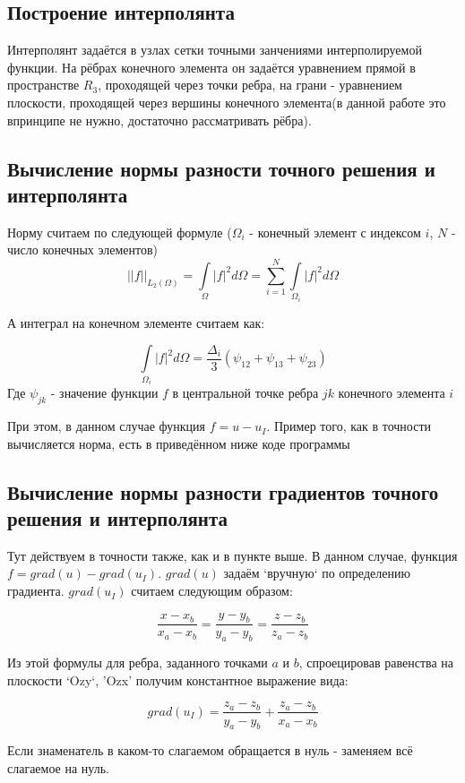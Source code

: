 \documentclass[12pt]{article}
\begin{document}
\subsection{Построение интерполянта}
Интерполянт задаётся в узлах сетки точными занчениями интерполируемой функции. На рёбрах конечного элемента он задаётся уравнением прямой в пространстве $R_3$, проходящей через точки ребра, на грани - уравнением плоскости, проходящей через вершины конечного элемента(в данной работе это впринципе не нужно, достаточно рассматривать рёбра).

\subsection{Вычисление нормы разности точного решения и интерполянта}

Норму считаем по следующей формуле
($\Omega_i$ - конечный элемент с индексом $i$, $N$ - число конечных элементов)
$$
||f||_{L_2(\Omega)} = \int\limits_{\Omega}|f|^2d\Omega = \sum_{i=1}^{N}\int\limits_{\Omega_i}|f|^2d\Omega
$$

А интеграл на конечном элементе считаем как:

$$
\int\limits_{\Omega_i}|f|^2d\Omega = \dfrac{\Delta_i}{3}(\psi_{12} + \psi_{13} + \psi_{23})
$$
Где $\psi_{jk}$ - значение функции $f$ в центральной точке ребра $jk$ конечного элемента $i$

При этом, в данном случае функция $f = u - u_I$. Пример того, как в точности вычисляется норма, есть в приведённом ниже коде программы

\subsection{Вычисление нормы разности градиентов точного решения и интерполянта}

Тут действуем в точности также, как и в пункте выше. В данном случае, функция $f = grad(u) - grad(u_I)$. $grad(u)$ задаём `вручную` по определению градиента. $grad(u_I)$ считаем следующим образом:

$$
\dfrac{x-x_b}{x_a-x_b}=\dfrac{y-y_b}{y_a-y_b}=\dfrac{z-z_b}{z_a-z_b}
$$

Из этой формулы для ребра, заданного точками $a$ и $b$, спроецировав равенства на плоскости `Ozy`, 'Ozx' получим константное выражение вида:

$$
grad(u_I) = \dfrac{z_a-z_b}{y_a-y_b} + \dfrac{z_a-z_b}{x_a-x_b}
$$

Если знаменатель в каком-то слагаемом обращается в нуль - заменяем всё слагаемое на нуль.
\end{document}
